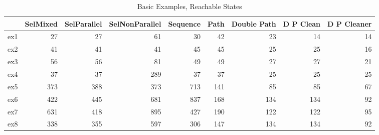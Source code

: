 \begin{table}
\centering
\caption{Basic Examples, Reachable States}
\label{b_e_reach}
\begin{tabular}{lrrrrrrrr}
\toprule
{} &  SelMixed &  SelParallel &  SelNonParallel &  Sequence &  Path &  Double Path &  D P Clean &  D P Cleaner \\
\midrule
ex1 &        27 &           27 &              61 &        30 &    42 &           23 &         14 &           14 \\
ex2 &        41 &           41 &              41 &        45 &    45 &           25 &         25 &           16 \\
ex3 &        56 &           56 &              81 &        49 &    49 &           27 &         27 &           21 \\
ex4 &        37 &           37 &             289 &        37 &    37 &           25 &         25 &           25 \\
ex5 &       373 &          388 &             373 &       713 &   141 &           85 &         85 &           67 \\
ex6 &       422 &          445 &             681 &       837 &   168 &          134 &        134 &           92 \\
ex7 &       631 &          418 &             895 &       427 &   190 &          122 &        122 &           95 \\
ex8 &       338 &          355 &             597 &       306 &   147 &          134 &        134 &           92 \\
\bottomrule
\end{tabular}
\end{table}
